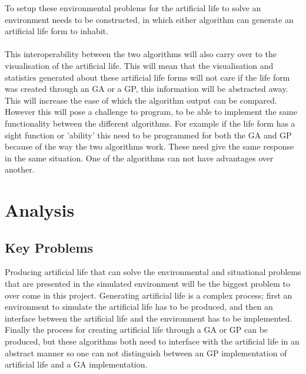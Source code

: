 \documentclass[12pt]{article}
\begin{document}
To setup these environmental problems for the artificial life to solve an environment needs to be constructed, in which either algorithm can generate an artificial life form
to inhabit.

\paragraph{}
This interoperability between the two algorithms will also carry over to the visualisation of the artificial life. This will mean
that the visualisation and statistics generated about these artificial life forms will not care if the life form was created
through an GA or a GP, this information will be abstracted away. This will increase the ease of which the algorithm output can
be compared. However this will pose a challenge to program, to be able to implement the same functionality between the 
different algorithms. For example if the life form has a sight function or 'ability' this need to be programmed for both
the GA and GP because of the way the two algorithms work. These need give the same response in the same situation. One of the
algorithms can not have advantages over another.
	

\section{Analysis}

\subsection{Key Problems}
Producing artificial life that can solve the environmental and situational problems that are presented in the simulated environment %
will be the biggest problem to over come in this project. Generating artificial life is a complex process; first an environment to simulate the artificial life has to be produced, and then
an interface between the artificial life and the environment has to be implemented. Finally the process for creating artificial life through a GA or GP can be produced, but these algorithms
both need to interface with the artificial life in an abstract manner so one can not distinguish between an GP implementation of artificial life and a GA implementation.
\end{document}
